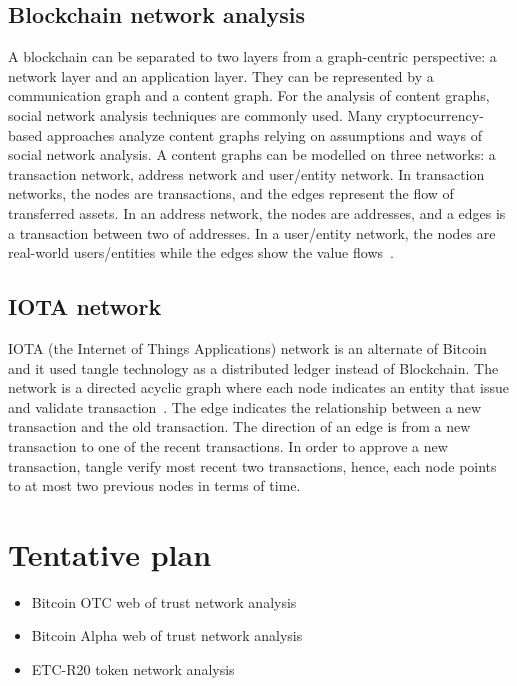 \documentclass[onecolumn, 12pt]{IEEEtran}
\begin{document}
\subsection{Blockchain network analysis}
A blockchain can be separated to two layers from a graph-centric perspective: a network layer and an application layer. They can be represented by a communication graph and a content graph. For the analysis of content graphs, social network analysis techniques are commonly used. Many cryptocurrency-based approaches analyze content graphs relying on assumptions and ways of social network analysis. A content graphs can be modelled on three networks: a transaction network, address network and user/entity network. In transaction networks, the nodes are transactions, and the edges represent the flow of transferred assets. In an address network, the nodes are addresses, and a edges is a transaction between two of addresses. In a user/entity network, the nodes are real-world users/entities while the edges show the value flows~\cite{victormeasuring}.

\subsection{IOTA network}
IOTA (the Internet of Things Applications) network is an alternate of Bitcoin and it used tangle technology as a distributed ledger instead of Blockchain. The network is a directed acyclic graph where each node indicates an entity that issue and
validate transaction~\cite{popov2016tangle}. The edge indicates the relationship
between a new transaction and the old transaction. The direction of an edge is
from a new transaction to one of the recent transactions. In order to approve a
new transaction, tangle verify most recent two transactions, hence, each node
points to at most two previous nodes in terms of time.

\section{Tentative plan}
\begin{itemize}
 \item  Bitcoin OTC web of trust network analysis
 \item  Bitcoin Alpha web of trust network analysis
 \item  ETC-R20 token network analysis
\end{itemize}

%



\end{document}
